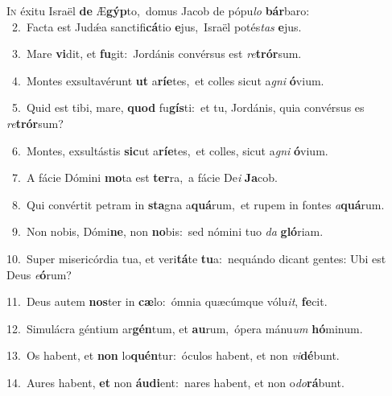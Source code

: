 \lettrine{\initial\textcolor{\initialcolor}{I}}{n} éxitu Israël \textbf{de} Æ\-\textbf{gýp}\-to,~\star domus Jacob de pópu\textit{lo} \textbf{bár}\-baro:\\
{\numbfont\textcolor{\numbcolor}{~2.}}~Facta est Judǽa sanctifi\-\textbf{cá}\-tio \textbf{e}\-jus,~\star Israël potés\textit{tas} \textbf{e}\-jus.\par
{\numbfont\textcolor{\numbcolor}{~3.}}~Mare \textbf{vi}\-dit, et \textbf{fu}\-git:~\star Jordánis convérsus est \textit{re}\-\textbf{trór}sum.\par
{\numbfont\textcolor{\numbcolor}{~4.}}~Montes exsultavérunt \textbf{ut} a\-\textbf{rí}\-\textbf{e}tes,~\star et colles sicut a\textit{gni} \textbf{ó}\-vium.\par
{\numbfont\textcolor{\numbcolor}{~5.}}~Quid est tibi, mare, \textbf{quod} fu\-\textbf{gís}\-ti:~\star et tu, Jordánis, quia convérsus es \textit{re}\-\textbf{trór}sum?\par
{\numbfont\textcolor{\numbcolor}{~6.}}~Montes, exsultástis \textbf{sic}\-ut a\-\textbf{rí}\-\textbf{e}tes,~\star et colles, sicut a\textit{gni} \textbf{ó}\-vium.\par
{\numbfont\textcolor{\numbcolor}{~7.}}~A fácie Dómini \textbf{mo}\-ta est \textbf{ter}\-ra,~\star a fácie De\textit{i} \textbf{Ja}\-cob.\par
{\numbfont\textcolor{\numbcolor}{~8.}}~Qui convértit petram in \textbf{sta}\-gna a\-\textbf{quá}\-rum,~\star et rupem in fontes \textit{a}\-\textbf{quá}rum.\par
{\numbfont\textcolor{\numbcolor}{~9.}}~Non nobis, Dómi\-\textbf{ne}\-, non \textbf{no}\-bis:~\star sed nómini tuo \textit{da} \textbf{gló}\-riam.\par
{\numbfont\textcolor{\numbcolor}{10.}}~Super misericórdia tua, et veri\-\textbf{tá}\-te \textbf{tu}\-a:~\star nequándo dicant gentes: Ubi est Deus \textit{e}\-\textbf{ó}rum?\par
{\numbfont\textcolor{\numbcolor}{11.}}~Deus autem \textbf{nos}\-ter in \textbf{cæ}\-lo:~\star ómnia quæcúmque vólu\-\textit{it}\-, \textbf{fe}\-cit.\par
{\numbfont\textcolor{\numbcolor}{12.}}~Simulácra géntium ar\-\textbf{gén}\-tum, et \textbf{au}\-rum,~\star ópera mánu\textit{um} \textbf{hó}\-minum.\par
{\numbfont\textcolor{\numbcolor}{13.}}~Os habent, et \textbf{non} lo\-\textbf{quén}\-tur:~\star óculos habent, et non \textit{vi}\-\textbf{dé}bunt.\par
{\numbfont\textcolor{\numbcolor}{14.}}~Aures habent, \textbf{et} non \textbf{áu}\-\textbf{di}ent:~\star nares habent, et non o\-\textit{do}\-\textbf{rá}bunt.\par

